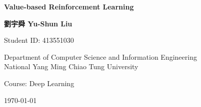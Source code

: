 \begin{titlepage}
    \begin{center}
        \vspace*{2cm}
        
        \Huge
        \textbf{Value-based Reinforcement Learning}
        
        \vspace{1.5cm}
        
        \Large
        \textbf{劉宇舜 Yu-Shun Liu}
        
        \vspace{1cm}
        
        \large
        Student ID: 413551030
        
        \vspace{2cm}
        
        \large
        Department of Computer Science and Information Engineering\\
        National Yang Ming Chiao Tung University
        
        \vspace{1cm}
        
        \large
        Course: Deep Learning
        
        \vspace{1cm}
        
        \large
        \today
        
    \end{center}
\end{titlepage} 